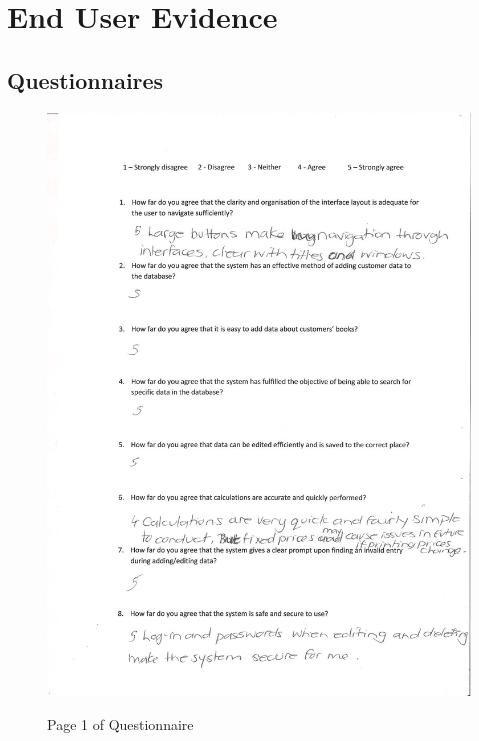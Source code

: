 \section{End User Evidence}

\subsection{Questionnaires} 

\begin{figure}[H]
    \includegraphics[width=\textwidth]{./Evaluation/Questionnaire1.png}
    \label{fig:QuestionnairePage1} \caption{Page 1 of Questionnaire}
\end{figure}

